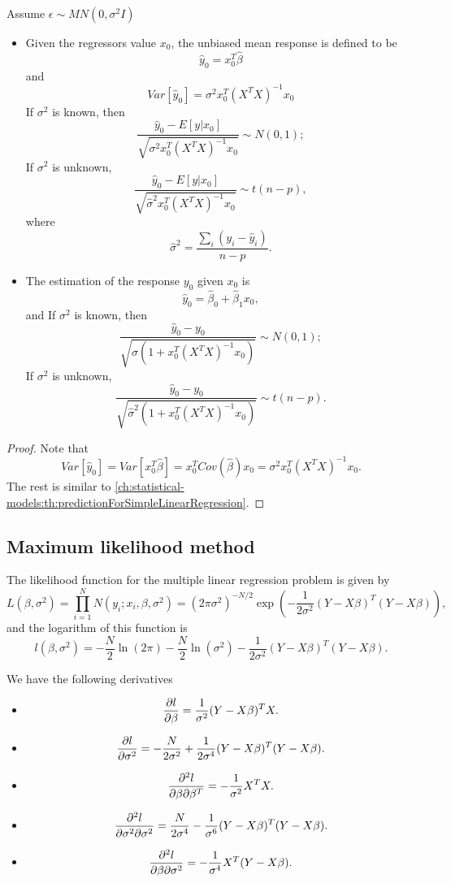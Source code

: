 \begin{refsection}
\begin{lemma}\cite[94,99]{montgomery2012introduction}
Assume $\epsilon\sim MN(0,\sigma^2 I)$
\begin{itemize}
	\item Given the regressors value $x_0$, the unbiased mean response is defined to be
$$\hat{y}_0=x_0^T\hat{\beta}$$
and
$$Var[\hat{y}_0] = \sigma^2x_0^T(X^TX)^{-1}x_0$$
	If $\sigma^2$ is known, then
$$\frac{\hat{y}_0 - E[y|x_0]}{\sqrt{\sigma^2 x_0^T(X^TX)^{-1}x_0}}\sim N(0,1);$$
	If $\sigma^2$ is unknown,
$$\frac{\hat{y}_0 - E[y|x_0]}{\sqrt{\hat{\sigma}^2 x_0^T(X^TX)^{-1}x_0}}\sim t(n-p),$$
where
	$$\hat{\sigma}^2 = \frac{\sum_i (y_i - \hat{y}_i)}{n-p}.$$

\item The estimation of the response $y_0$ given $x_0$ is
$$\hat{y}_0 = \hat{\beta}_0 + \hat{\beta}_1x_0,$$
and 
	If $\sigma^2$ is known, then
$$\frac{\hat{y}_0 -y_0}{\sqrt{\sigma (1+x_0^T(X^TX)^{-1}x_0)}}\sim N(0,1);$$
	If $\sigma^2$ is unknown,
$$\frac{\hat{y}_0 - y_0}{\sqrt{\hat{\sigma}^2 (1 + x_0^T(X^TX)^{-1}x_0)}}\sim t(n-p).$$
\end{itemize}
\end{lemma}
\begin{proof}
Note that	
$$Var[\hat{y}_0] = Var[x_0^T\hat{\beta}] = x_0^T Cov(\hat{\beta})x_0 =  \sigma^2x_0^T(X^TX)^{-1}x_0.$$
The rest is similar to \autoref{ch:statistical-models:th:predictionForSimpleLinearRegression}.
\end{proof}


\subsection{Maximum likelihood method}
\begin{theorem}\label{ch:statistical-models:th:maximumLikelihoodMethodLinearRegression}
The likelihood function for the multiple linear regression problem is given by	
	$$L(\beta, \sigma^2) = \prod_{i=1}^{N} N(y_i;x_i,\beta, \sigma^2) = (2\pi\sigma^2)^{-N/2}\exp(-\frac{1}{2\sigma^2}(Y-X\beta)^T(Y-X\beta)),$$
and the logarithm of this function is
$$l(\beta, \sigma^2) = -\frac{N}{2}\ln(2\pi)-\frac{N}{2}\ln(\sigma^2) -\frac{1}{2\sigma^2}(Y-X\beta)^T(Y-X\beta).$$

We have the following derivatives
\begin{itemize}
	\item 
	$$\frac{\partial l}{\partial \beta} = \frac{1}{\sigma^2}(Y-X\beta)^TX.$$
	\item 
	$$\frac{\partial l}{\partial \sigma^2} = -\frac{N}{2\sigma^2} + \frac{1}{2\sigma^4}(Y-X\beta)^T(Y-X\beta).$$
	\item 
	$$\frac{\partial^2 l}{\partial \beta\partial \beta^T} = -\frac{1}{\sigma^2}X^TX.$$
	\item 
	$$\frac{\partial^2 l}{\partial \sigma^2\partial \sigma^2} = \frac{N}{2\sigma^4} -\frac{1}{\sigma^6}(Y-X\beta)^T(Y-X\beta).$$
	\item 
	$$\frac{\partial^2 l}{\partial \beta\partial \sigma^2} = -\frac{1}{\sigma^4}X^T(Y-X\beta).$$
\end{itemize}	


\end{theorem}
\end{refsection}
